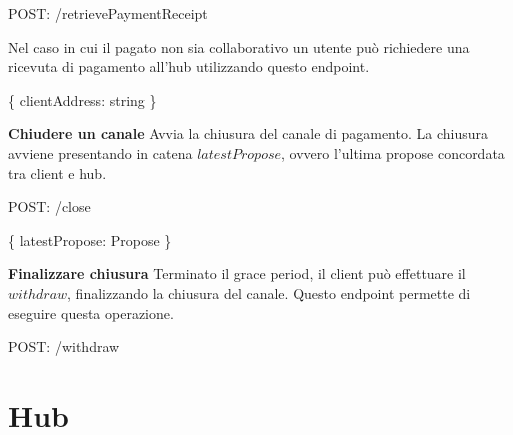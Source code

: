 \documentclass[12pt,italian,]{book}
\newenvironment{Shaded}{}{}
\newcommand{\DataTypeTok}[1]{\textcolor[rgb]{0.56,0.13,0.00}{#1}}
\newcommand{\NormalTok}[1]{#1}
\newcommand{\OperatorTok}[1]{\textcolor[rgb]{0.40,0.40,0.40}{#1}}
\newcommand{\SpecialStringTok}[1]{\textcolor[rgb]{0.73,0.40,0.53}{#1}}
\begin{document}
\begin{Shaded}
\begin{Highlighting}[]
\NormalTok{POST}\OperatorTok{:} \SpecialStringTok{/retrievePaymentReceipt}
\end{Highlighting}
\end{Shaded}

Nel caso in cui il pagato non sia collaborativo un utente può richiedere una ricevuta di pagamento all'hub utilizzando questo endpoint.

\begin{Shaded}
\begin{Highlighting}[]
\OperatorTok{\{}
    \DataTypeTok{clientAddress}\OperatorTok{:}\NormalTok{ string}
\OperatorTok{\}}
\end{Highlighting}
\end{Shaded}

\textbf{\textbf{Chiudere un canale}} Avvia la chiusura del canale di pagamento. La chiusura avviene presentando in catena \(latestPropose\), ovvero l'ultima propose concordata tra client e hub.

\begin{Shaded}
\begin{Highlighting}[]
\NormalTok{POST}\OperatorTok{:} \SpecialStringTok{/close}
\end{Highlighting}
\end{Shaded}

\begin{Shaded}
\begin{Highlighting}[]
\OperatorTok{\{}
    \DataTypeTok{latestPropose}\OperatorTok{:}\NormalTok{ Propose}
\OperatorTok{\}}
\end{Highlighting}
\end{Shaded}

\textbf{\textbf{Finalizzare chiusura}} Terminato il grace period, il client può effettuare il \(withdraw\), finalizzando la chiusura del canale. Questo endpoint permette di eseguire questa operazione.

\begin{Shaded}
\begin{Highlighting}[]
\NormalTok{POST}\OperatorTok{:} \SpecialStringTok{/withdraw}
\end{Highlighting}
\end{Shaded}

\hypertarget{hub}{%
\section{Hub}\label{hub}}
\end{document}
